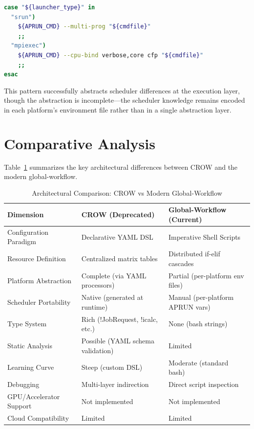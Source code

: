 \documentclass[11pt,twocolumn]{article}
\begin{document}
\begin{lstlisting}[language=Bash, caption={MPMD Execution Abstraction}]
case "${launcher_type}" in
  "srun")
    ${APRUN_CMD} --multi-prog "${cmdfile}"
    ;;
  "mpiexec")
    ${APRUN_CMD} --cpu-bind verbose,core cfp "${cmdfile}"
    ;;
esac
\end{lstlisting}

This pattern successfully abstracts scheduler differences at the execution layer, though the abstraction is incomplete---the scheduler knowledge remains encoded in each platform's environment file rather than in a single abstraction layer.

\section{Comparative Analysis}

Table~\ref{tab:comparison} summarizes the key architectural differences between CROW and the modern global-workflow.

\begin{table}[t]
\centering
\caption{Architectural Comparison: CROW vs Modern Global-Workflow}
\label{tab:comparison}
\begin{tabular}{@{}lll@{}}
\toprule
\textbf{Dimension} & \textbf{CROW (Deprecated)} & \textbf{Global-Workflow (Current)} \\
\midrule
Configuration Paradigm & Declarative YAML DSL & Imperative Shell Scripts \\
Resource Definition & Centralized matrix tables & Distributed if-elif cascades \\
Platform Abstraction & Complete (via YAML processors) & Partial (per-platform env files) \\
Scheduler Portability & Native (generated at runtime) & Manual (per-platform APRUN vars) \\
Type System & Rich (!JobRequest, !icalc, etc.) & None (bash strings) \\
Static Analysis & Possible (YAML schema validation) & Limited \\
Learning Curve & Steep (custom DSL) & Moderate (standard bash) \\
Debugging & Multi-layer indirection & Direct script inspection \\
GPU/Accelerator Support & Not implemented & Not implemented \\
Cloud Compatibility & Limited & Limited \\
\bottomrule
\end{tabular}
\end{table}
\end{document}
